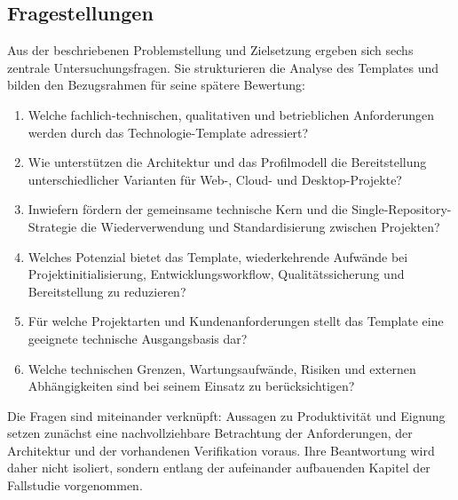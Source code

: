 \subsection{Fragestellungen}
\label{subsec:fragestellungen}

Aus der beschriebenen Problemstellung und Zielsetzung ergeben sich sechs
zentrale Untersuchungsfragen. Sie strukturieren die Analyse des Templates und
bilden den Bezugsrahmen für seine spätere Bewertung:

\begin{enumerate}
  \item Welche fachlich-technischen, qualitativen und betrieblichen
    Anforderungen werden durch das Technologie-Template adressiert?
  \item Wie unterstützen die Architektur und das Profilmodell die
    Bereitstellung unterschiedlicher Varianten für Web-, Cloud- und
    Desktop-Projekte?
  \item Inwiefern fördern der gemeinsame technische Kern und die
    Single-Repository-Strategie die Wiederverwendung und Standardisierung
    zwischen Projekten?
  \item Welches Potenzial bietet das Template, wiederkehrende Aufwände bei
    Projektinitialisierung, Entwicklungsworkflow, Qualitätssicherung und
    Bereitstellung zu reduzieren?
  \item Für welche Projektarten und Kundenanforderungen stellt das Template
    eine geeignete technische Ausgangsbasis dar?
  \item Welche technischen Grenzen, Wartungsaufwände, Risiken und externen
    Abhängigkeiten sind bei seinem Einsatz zu berücksichtigen?
\end{enumerate}

Die Fragen sind miteinander verknüpft: Aussagen zu Produktivität und Eignung
setzen zunächst eine nachvollziehbare Betrachtung der Anforderungen, der
Architektur und der vorhandenen Verifikation voraus. Ihre Beantwortung wird
daher nicht isoliert, sondern entlang der aufeinander aufbauenden Kapitel der
Fallstudie vorgenommen.
